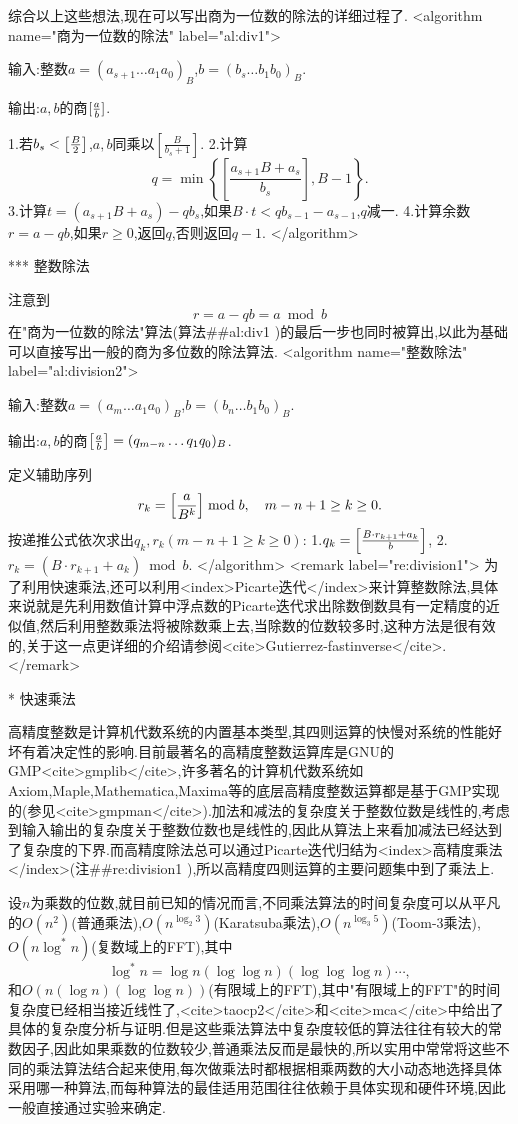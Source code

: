 综合以上这些想法,现在可以写出商为一位数的除法的详细过程了.
<algorithm  name="商为一位数的除法" label="al:div1">

输入:整数$a=(a_{s+1}\ldots a_1a_0)_B$,$b=(b_s\ldots b_1b_0)_B$.

输出:$a,b$的商$[{a\over b}]$.

 1.若$b_s<\left[{B\over 2}\right]$,$a,b$同乘以$\left[\frac{B}{b_s+1}\right]$.
 2.计算$$q = \min\left\{\left[\frac{a_{s+1}B+a_s}{b_s}\right],B-1\right\}.$$
 3.计算$t=(a_{s+1}B+a_s)-qb_s$,如果$B\cdot t<qb_{s-1}-a_{s-1}$,$q$减一.
 4.计算余数$r=a-qb$,如果$r\ge 0$,返回$q$,否则返回$q-1$.
</algorithm>

*** 整数除法

注意到$$r=a-qb=a\bmod b$$在"商为一位数的除法"算法(算法##al:div1
)的最后一步也同时被算出,以此为基础可以直接写出一般的商为多位数的除法算法.
<algorithm  name="整数除法" label="al:division2">

输入:整数$a=(a_m\ldots a_1a_0)_B$,$b=(b_n\ldots b_1b_0)_B$.

输出:$a,b$的商$\left[{a\over b}\right]=(q_{m-n}\ldots q_1q_0)_B$.

定义辅助序列$$r_k=\left[{a\over B^k}\right]\bmod b,\quad m-n+1\ge k\ge 0.$$
按递推公式依次求出$q_k,r_k(m-n+1\ge k\ge 0)$:
 1.$q_k=\left[{B\cdot r_{k+1}+a_k\over b}\right]$,
 2.$r_k=(B\cdot r_{k+1}+a_k)\bmod b$.
</algorithm>
<remark label="re:division1">
为了利用快速乘法,还可以利用<index>Picarte迭代</index>来计算整数除法,具体来说就是先利用数值计算中浮点数的Picarte迭代求出除数倒数具有一定精度的近似值,然后利用整数乘法将被除数乘上去,当除数的位数较多时,这种方法是很有效的,关于这一点更详细的介绍请参阅<cite>Gutierrez-fastinverse</cite>.
</remark>

* 快速乘法

高精度整数是计算机代数系统的内置基本类型,其四则运算的快慢对系统的性能好坏有着决定性的影响.目前最著名的高精度整数运算库是GNU的GMP<cite>gmplib</cite>,许多著名的计算机代数系统如Axiom,Maple,Mathematica,Maxima等的底层高精度整数运算都是基于GMP实现的(参见<cite>gmpman</cite>).加法和减法的复杂度关于整数位数是线性的,考虑到输入输出的复杂度关于整数位数也是线性的,因此从算法上来看加减法已经达到了复杂度的下界.而高精度除法总可以通过Picarte迭代归结为<index>高精度乘法</index>(注##re:division1
),所以高精度四则运算的主要问题集中到了乘法上.

设$n$为乘数的位数,就目前已知的情况而言,不同乘法算法的时间复杂度可以从平凡的$O(n^2)$(普通乘法),$O(n^{\log_2{3}})$(Karatsuba乘法),$O(n^{\log_3{5}})$(Toom-3乘法),$O(n\log^*{n})$(复数域上的FFT),其中$$\log^*{n}=\log{n}(\log{\log{n}})(\log{\log{\log{n}}})\cdots,$$和$O(n(\log{n})(\log{\log{n}}))$(有限域上的FFT),其中"有限域上的FFT"的时间复杂度已经相当接近线性了,<cite>taocp2</cite>和<cite>mca</cite>中给出了具体的复杂度分析与证明.但是这些乘法算法中复杂度较低的算法往往有较大的常数因子,因此如果乘数的位数较少,普通乘法反而是最快的,所以实用中常常将这些不同的乘法算法结合起来使用,每次做乘法时都根据相乘两数的大小动态地选择具体采用哪一种算法,而每种算法的最佳适用范围往往依赖于具体实现和硬件环境,因此一般直接通过实验来确定.

